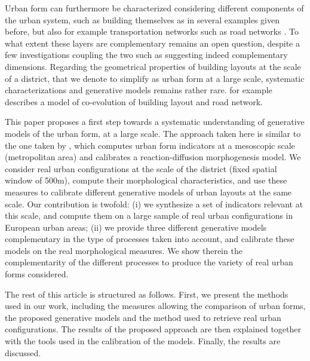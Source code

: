 \documentclass[letterpaper]{article}
\begin{document}

Urban form can furthermore be characterized considering different components of the urban system, such as building themselves as in several examples given before, but also for example transportation networks such as road networks \citep{ye2014quantitative}. To what extent these layers are complementary remains an open question, despite a few investigations coupling the two such as \cite{raimbault2018urban} suggesting indeed complementary dimensions. Regarding the geometrical properties of building layouts at the scale of a district, that we denote to simplify as urban form at a large scale, systematic characterizations and generative models remains rather rare. \cite{achibet2014model} for example describes a model of co-evolution of building layout and road network.



This paper proposes a first step towards a systematic understanding of generative models of the urban form, at a large scale.
The approach taken here is similar to the one taken by \cite{raimbault2018calibration}, which computes urban form indicators at a mesoscopic scale (metropolitan area) and calibrates a reaction-diffusion morphogenesis model.
We consider real urban configurations at the scale of the district (fixed spatial window of 500m), compute their morphological characteristics, and use these measures to calibrate different generative models of urban layouts at the same scale.
Our contribution is twofold: (i) we synthesize a set of indicators relevant at this scale, and compute them on a large sample of real urban configurations in European urban areas; (ii) we provide three different generative models complementary in the type of processes taken into account, and calibrate these models on the real morphological measures. We show therein the complementarity of the different processes to produce the variety of real urban forms considered.

The rest of this article is structured as follows.
First, we present the methods used in our work, including the measures allowing the comparison of urban forms, the proposed generative models and the method used to retrieve real urban configurations.
The results of the proposed approach are then explained together with the tools used in the calibration of the models.
Finally, the results are discussed.
\end{document}
